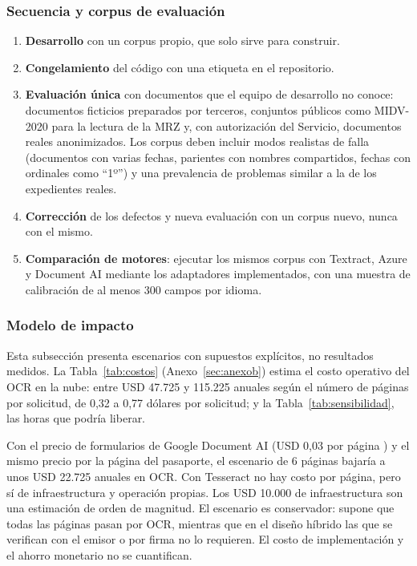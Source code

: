 \documentclass[11pt,a4paper]{article}
\begin{document}
\subsubsection{Secuencia y corpus de evaluación}
\begin{enumerate}
  \item \textbf{Desarrollo} con un corpus propio, que solo sirve para construir.
  \item \textbf{Congelamiento} del código con una etiqueta en el repositorio.
  \item \textbf{Evaluación única} con documentos que el equipo de desarrollo no conoce: documentos ficticios preparados por terceros, conjuntos públicos como MIDV-2020 \cite{bulatov2022} para la lectura de la MRZ y, con autorización del Servicio, documentos reales anonimizados. Los corpus deben incluir modos realistas de falla (documentos con varias fechas, parientes con nombres compartidos, fechas con ordinales como ``1º'') y una prevalencia de problemas similar a la de los expedientes reales.
  \item \textbf{Corrección} de los defectos y nueva evaluación con un corpus nuevo, nunca con el mismo.
  \item \textbf{Comparación de motores}: ejecutar los mismos corpus con Textract, Azure y Document AI mediante los adaptadores implementados, con una muestra de calibración de al menos 300 campos por idioma.
\end{enumerate}

\subsubsection{Modelo de impacto}
\label{sec:impacto}
Esta subsección presenta escenarios con supuestos explícitos, no resultados medidos. La Tabla~\ref{tab:costos} (Anexo~\ref{sec:anexob}) estima el costo operativo del OCR en la nube: entre USD 47.725 y 115.225 anuales según el número de páginas por solicitud, de 0,32 a 0,77 dólares por solicitud; y la Tabla~\ref{tab:sensibilidad}, las horas que podría liberar.

Con el precio de formularios de Google Document AI (USD 0,03 por página \cite{googlepricing}) y el mismo precio por la página del pasaporte, el escenario de 6 páginas bajaría a unos USD 22.725 anuales en OCR. Con Tesseract no hay costo por página, pero sí de infraestructura y operación propias. Los USD 10.000 de infraestructura son una estimación de orden de magnitud. El escenario es conservador: supone que todas las páginas pasan por OCR, mientras que en el diseño híbrido las que se verifican con el emisor o por firma no lo requieren. El costo de implementación y el ahorro monetario no se cuantifican.
\end{document}
